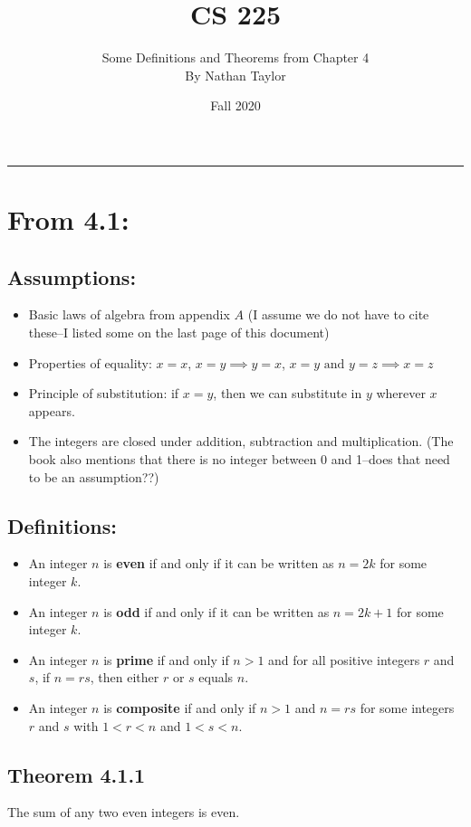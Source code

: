 \documentclass[11pt]{article}
\title{CS 225}
\author{{\Large Some Definitions and Theorems from Chapter 4} \\ {\small By Nathan Taylor}}
\date{Fall 2020}
\begin{document}
\maketitle
\hrule

\section*{From 4.1:}
\subsection*{Assumptions:}
\begin{itemize}
    \item Basic laws of algebra from appendix $A$ (I assume we do not have to cite these--I listed some on
    the last page of this document)
    \item Properties of equality: $x = x$, $x = y \implies y = x$, $x = y \text{ and } y = z \implies x = z$
    \item Principle of substitution: if $x = y$, then we can substitute in $y$ wherever $x$ appears. 
    \item The integers are closed under addition, subtraction and multiplication. (The book also 
    mentions that there is no integer between 0 and 1--does that need to be an assumption??)
\end{itemize}

\subsection*{Definitions:}
\begin{itemize}
    \item An integer $n$ is {\bf even} if and only if 
    it can be written as $n = 2k$ for some integer $k$. 
    \item An integer $n$ is {\bf odd} if and only if 
    it can be written as $n = 2k + 1$ for some integer $k$. 
    \item An integer $n$ is {\bf prime} if and only if 
    $n > 1$ and for all positive integers $r$ and $s$, if 
    $n = rs$, then either $r$ or $s$ equals $n$. 
    \item An integer $n$ is {\bf composite} if and only if
    $n > 1$ and $n = rs$ for some integers $r$ and $s$ with
    $1< r< n$ and $1< s< n$. 
\end{itemize}

\subsection*{Theorem 4.1.1}
The sum of any two even integers is even. 
\end{document}
